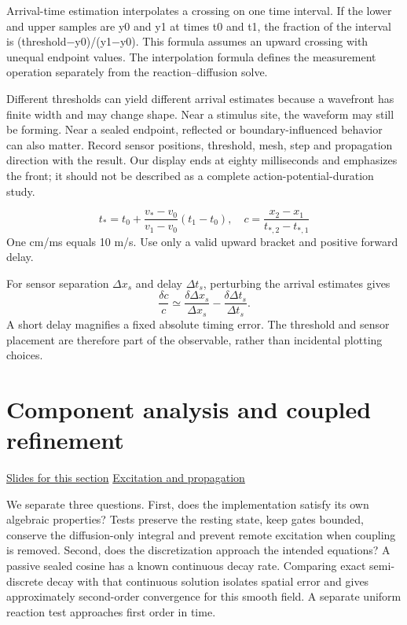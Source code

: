 \documentclass[11pt,letterpaper]{article}
\theoremstyle{definition}\newtheorem{definition}{Definition}\newtheorem{example}{Example}
\numberwithin{equation}{section}
\begin{document}
Arrival-time estimation interpolates a crossing on one time interval. If the lower and upper samples are y0 and y1 at times t0 and t1, the fraction of the interval is (threshold\ensuremath{-}y0)/(y1\ensuremath{-}y0). This formula assumes an upward crossing with unequal endpoint values. The interpolation formula defines the measurement operation separately from the reaction--diffusion solve.

Different thresholds can yield different arrival estimates because a wavefront has finite width and may change shape. Near a stimulus site, the waveform may still be forming. Near a sealed endpoint, reflected or boundary-influenced behavior can also matter. Record sensor positions, threshold, mesh, step and propagation direction with the result. Our display ends at eighty milliseconds and emphasizes the front; it should not be described as a complete action-potential-duration study.

\[
t_*=t_0+\frac{v_*-v_0}{v_1-v_0}(t_1-t_0),\quad c=\frac{x_2-x_1}{t_{*,2}-t_{*,1}}
\]
One cm/ms equals 10 m/s. Use only a valid upward bracket and positive forward delay.

For sensor separation $\Delta x_s$ and delay $\Delta t_s$, perturbing the arrival estimates gives
\[
 \frac{\delta c}{c}\simeq\frac{\delta\Delta x_s}{\Delta x_s}
 -\frac{\delta\Delta t_s}{\Delta t_s}.
\]
A short delay magnifies a fixed absolute timing error. The threshold and sensor placement are therefore part of the observable, rather than incidental plotting choices.
\section{Component analysis and coupled refinement}
\hypertarget{note-component-analysis-and-coupled-refinement}{}\label{note:component-analysis-and-coupled-refinement}
{\small \href{slides.html\#frame=timing-error-propagates-into-speed-panel-1\&step=1}{Slides for this section} \quad \href{../modules/animations/excitable-wave.html}{Excitation and propagation}}\par
We separate three questions. First, does the implementation satisfy its own algebraic properties? Tests preserve the resting state, keep gates bounded, conserve the diffusion-only integral and prevent remote excitation when coupling is removed. Second, does the discretization approach the intended equations? A passive sealed cosine has a known continuous decay rate. Comparing exact semi-discrete decay with that continuous solution isolates spatial error and gives approximately second-order convergence for this smooth field. A separate uniform reaction test approaches first order in time.
\end{document}
